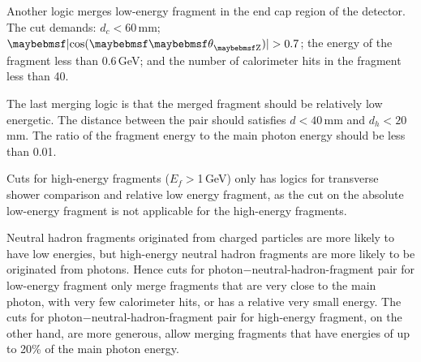 Another logic merges low-energy fragment in the  end cap region of the detector. The cut demands: $d_c < 60$\,mm; $\absCosTheta > 0.7$; the energy of the fragment less than 0.6\,GeV; and the number of calorimeter hits in the fragment less than 40.


The last merging logic is that the merged fragment should be relatively low energetic. The distance between the pair should satisfies $d < 40$\,mm and $d_h < 20$\,mm. The ratio of the fragment energy  to the main photon energy should be less than 0.01.







Cuts for high-energy fragments ($E_f>$1\,GeV) only has logics for transverse shower comparison and relative low energy fragment, as the cut on the absolute low-energy fragment is not applicable for the  high-energy fragments.

Neutral hadron fragments originated from charged particles are more likely to have low energies, but high-energy neutral hadron fragments are more likely to be originated from photons. Hence cuts for photon$-$neutral-hadron-fragment pair for low-energy fragment only merge fragments that are very close to the main photon, with very few calorimeter hits, or has a relative very small energy. The cuts for photon$-$neutral-hadron-fragment pair for high-energy fragment, on the other hand, are more generous, allow merging fragments that have energies of up to 20\% of the main photon energy.


